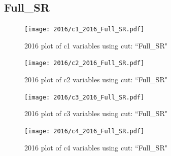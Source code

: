 \documentclass{article}
\begin{document}
      \subsection*{Full\_SR}
                        \begin{figure}[H]
                            \centering
                            \caption{2016 plot of c1 variables using cut: ``Full\_SR"}
                            \texttt{[image: 2016/c1\_2016\_Full\_SR.pdf]}
                        \end{figure}    
                        \begin{figure}[H]
                            \centering
                            \caption{2016 plot of c2 variables using cut: ``Full\_SR"}
                            \texttt{[image: 2016/c2\_2016\_Full\_SR.pdf]}
                        \end{figure}    
                        \begin{figure}[H]
                            \centering
                            \caption{2016 plot of c3 variables using cut: ``Full\_SR"}
                            \texttt{[image: 2016/c3\_2016\_Full\_SR.pdf]}
                        \end{figure}    
                        \begin{figure}[H]
                            \centering
                            \caption{2016 plot of c4 variables using cut: ``Full\_SR"}
                            \texttt{[image: 2016/c4\_2016\_Full\_SR.pdf]}
                        \end{figure}    
\end{document}
